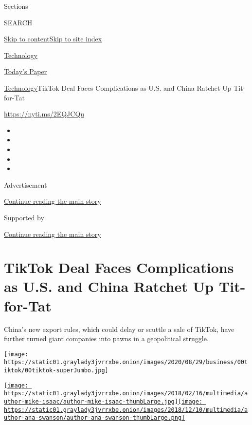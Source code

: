 Sections

SEARCH

\protect\hyperlink{site-content}{Skip to
content}\protect\hyperlink{site-index}{Skip to site index}

\href{https://www.nytimes3xbfgragh.onion/section/technology}{Technology}

\href{https://myaccount.nytimes3xbfgragh.onion/auth/login?response_type=cookie\&client_id=vi}{}

\href{https://www.nytimes3xbfgragh.onion/section/todayspaper}{Today's
Paper}

\href{/section/technology}{Technology}\textbar{}TikTok Deal Faces
Complications as U.S. and China Ratchet Up Tit-for-Tat

\url{https://nyti.ms/2EQJCQu}

\begin{itemize}
\item
\item
\item
\item
\item
\end{itemize}

Advertisement

\protect\hyperlink{after-top}{Continue reading the main story}

Supported by

\protect\hyperlink{after-sponsor}{Continue reading the main story}

\hypertarget{tiktok-deal-faces-complications-as-us-and-china-ratchet-up-tit-for-tat}{%
\section{TikTok Deal Faces Complications as U.S. and China Ratchet Up
Tit-for-Tat}\label{tiktok-deal-faces-complications-as-us-and-china-ratchet-up-tit-for-tat}}

China's new export rules, which could delay or scuttle a sale of TikTok,
have further turned giant companies into pawns in a geopolitical
struggle.

\texttt{[image: https://static01.graylady3jvrrxbe.onion/images/2020/08/29/business/00tiktok/00tiktok-superJumbo.jpg]}

\href{https://www.nytimes3xbfgragh.onion/by/mike-isaac}{\texttt{[image: https://static01.graylady3jvrrxbe.onion/images/2018/02/16/multimedia/author-mike-isaac/author-mike-isaac-thumbLarge.jpg]}}\href{https://www.nytimes3xbfgragh.onion/by/ana-swanson}{\texttt{[image: https://static01.graylady3jvrrxbe.onion/images/2018/12/10/multimedia/author-ana-swanson/author-ana-swanson-thumbLarge.png]}}

